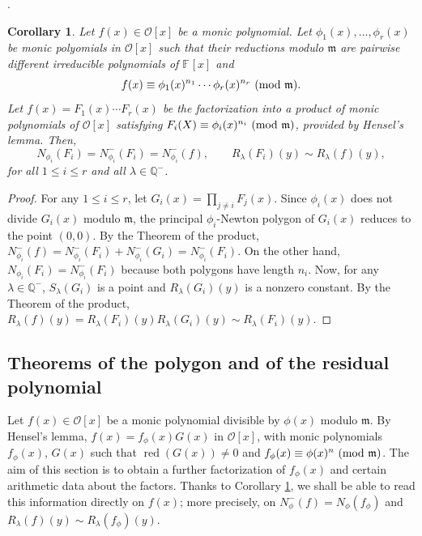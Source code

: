 \documentclass{amsart}
\newtheorem{corollary}[theorem]{Corollary}
\newcommand{\Q}{\mathbb Q}
\def\op{\operatorname}
\def\ff#1{\mathbb{F}_{#1}}
\def\la{\lambda}
\def\m{{\mathfrak m}}
\def\md#1{\ \mbox{\rm(mod }{#1})}
\def\nph#1{N_{\phi}(#1)}
\def\npp#1{N_{\phi}^-(#1)}
\def\oo{{\mathcal O}}
\def\rd{\op{red}}
\def\zpx{\oo[x]}
\begin{document}
.\medskip

\begin{corollary}\label{slopezero}
Let $f(x)\in\zpx$ be a monic polynomial. Let $\phi_1(x),\dots,\phi_r(x)$ be monic polyomials in $\zpx$ such that their reductions modulo $\m$ are pairwise different irreducible polynomials of $\ff{}[x]$ and
$$
f(x)\equiv \phi_1(x)^{n_1}\cdots \phi_r(x)^{n_r}\md{\m}.
$$  
Let $f(x)=F_1(x)\cdots F_r(x)$ be the factorization into a product of monic polynomials of $\zpx$ satisfying $F_i(X)\equiv \phi_i(x)^{n_i}\md{\m}$, provided by Hensel's lemma. Then, 
$$
N_{\phi_i}(F_i)=N_{\phi_i}^-(F_i)=N_{\phi_i}^-(f),\qquad R_{\la}(F_i)(y)\sim R_{\la}(f)(y),
$$for all $1\le i\le r$ and all $\la\in\Q^-$.
\end{corollary}

\begin{proof}For any $1\le i\le r$, let $G_i(x)=\prod_{j\ne i}F_j(x)$. Since $\phi_i(x)$ does not divide $G_i(x)$ modulo $\m$, the principal $\phi_i$-Newton polygon of $G_i(x)$ reduces to the point $(0,0)$. By the Theorem of the product, $N_{\phi_i}^-(f)=N_{\phi_i}^-(F_i)+N_{\phi_i}^-(G_i)=N_{\phi_i}^-(F_i)$. On the other hand, 
$N_{\phi_i}(F_i)=N_{\phi_i}^-(F_i)$ because both polygons have length $n_i$.
Now, for any $\la\in\Q^-$, $S_{\la}(G_i)$ is a point and $R_{\la}(G_i)(y)$ is a nonzero constant. By the 
 Theorem of the product, $R_{\la}(f)(y)=R_{\la}(F_i)(y)R_{\la}(G_i)(y)\sim R_{\la}(F_i)(y)$.
\end{proof}

\subsection{Theorems of the polygon and of the residual polynomial}
Let $f(x)\in\zpx$ be a monic polynomial divisible by $\phi(x)$ modulo $\m$. By Hensel's lemma, 
$f(x)=f_{\phi}(x)G(x)$ in $\zpx$, with monic polynomials $f_{\phi}(x)$, $G(x)$ such that $\rd(G(x))\ne0$ and
$f_{\phi}(x)\equiv \phi(x)^n\md{\m}$. The aim of this section is to obtain a further factori\-zation of $f_{\phi}(x)$ and certain arithmetic data about the factors. Thanks to Corollary \ref{slopezero}, we shall be able to read this information directly on $f(x)$; more precisely, on $\npp{f}=\nph{f_{\phi}}$ and $R_{\la}(f)(y)\sim R_{\la}(f_{\phi})(y)$.
\end{document}
